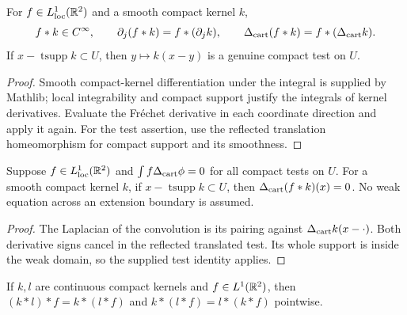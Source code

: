 \begin{lemma}
\label{lem:plane-convolution-calculus}
\leanok
For $f\in L^1_{\rm loc}(\mathbb{R}^2)$ and a smooth compact kernel $k$,
\[
 f*k\in C^\infty,\qquad
 \partial_j(f*k)=f*(\partial_jk),\qquad
 \Delta_{\rm cart}(f*k)=f*(\Delta_{\rm cart}k).
\]
If $x-\operatorname{tsupp}k\subset U$, then $y\mapsto k(x-y)$ is a genuine
compact test on $U$.
\end{lemma}

\begin{proof}
\leanok
Smooth compact-kernel differentiation under the integral is supplied by
Mathlib; local integrability and compact support justify the integrals of
kernel derivatives. Evaluate the Fr\'echet derivative in each coordinate
direction and apply it again. For the test assertion, use the reflected
translation homeomorphism for compact support and its smoothness.
\end{proof}

\begin{lemma}
\label{lem:weak-harmonic-smoothing}
\leanok
Suppose $f\in L^1_{\rm loc}(\mathbb{R}^2)$ and
$\int f\Delta_{\rm cart}\phi=0$ for all compact tests on $U$.
For a smooth compact kernel $k$, if $x-\operatorname{tsupp}k\subset U$,
then $\Delta_{\rm cart}(f*k)(x)=0$.
No weak equation across an extension boundary is assumed.
\end{lemma}

\begin{proof}
\leanok
The Laplacian of the convolution is its pairing against
$\Delta_{\rm cart}k(x-\cdot)$.
Both derivative signs cancel in the reflected translated test.
Its whole support is inside the weak domain, so the supplied test identity applies.
\end{proof}

\begin{lemma}
\label{lem:plane-convolution-kernel-exchange}
\leanok
If $k,l$ are continuous compact kernels and $f\in L^1(\mathbb{R}^2)$, then
$(k*l)*f=k*(l*f)$ and $k*(l*f)=l*(k*f)$ pointwise.
\end{lemma}


